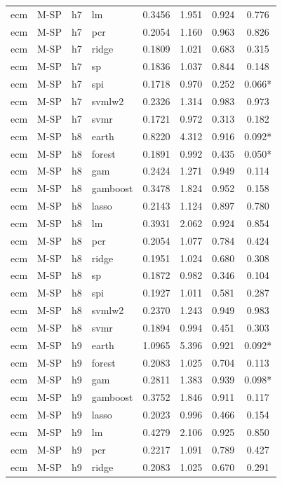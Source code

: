 \begin{ThreePartTable}
\begin{longtable}[t]{llclcccc}
ecm & M-SP & h7 & lm & 0.3456 & 1.951 & 0.924 & 0.776\\
ecm & M-SP & h7 & pcr & 0.2054 & 1.160 & 0.963 & 0.826\\
ecm & M-SP & h7 & ridge & 0.1809 & 1.021 & 0.683 & 0.315\\
ecm & M-SP & h7 & sp & 0.1836 & 1.037 & 0.844 & 0.148\\
ecm & M-SP & h7 & spi & 0.1718 & 0.970 & 0.252 & 0.066*\\
ecm & M-SP & h7 & svmlw2 & 0.2326 & 1.314 & 0.983 & 0.973\\
ecm & M-SP & h7 & svmr & 0.1721 & 0.972 & 0.313 & 0.182\\
\addlinespace
ecm & M-SP & h8 & earth & 0.8220 & 4.312 & 0.916 & 0.092*\\
ecm & M-SP & h8 & forest & 0.1891 & 0.992 & 0.435 & 0.050*\\
ecm & M-SP & h8 & gam & 0.2424 & 1.271 & 0.949 & 0.114\\
ecm & M-SP & h8 & gamboost & 0.3478 & 1.824 & 0.952 & 0.158\\
ecm & M-SP & h8 & lasso & 0.2143 & 1.124 & 0.897 & 0.780\\
ecm & M-SP & h8 & lm & 0.3931 & 2.062 & 0.924 & 0.854\\
ecm & M-SP & h8 & pcr & 0.2054 & 1.077 & 0.784 & 0.424\\
ecm & M-SP & h8 & ridge & 0.1951 & 1.024 & 0.680 & 0.308\\
ecm & M-SP & h8 & sp & 0.1872 & 0.982 & 0.346 & 0.104\\
ecm & M-SP & h8 & spi & 0.1927 & 1.011 & 0.581 & 0.287\\
ecm & M-SP & h8 & svmlw2 & 0.2370 & 1.243 & 0.949 & 0.983\\
ecm & M-SP & h8 & svmr & 0.1894 & 0.994 & 0.451 & 0.303\\
\addlinespace
ecm & M-SP & h9 & earth & 1.0965 & 5.396 & 0.921 & 0.092*\\
ecm & M-SP & h9 & forest & 0.2083 & 1.025 & 0.704 & 0.113\\
ecm & M-SP & h9 & gam & 0.2811 & 1.383 & 0.939 & 0.098*\\
ecm & M-SP & h9 & gamboost & 0.3752 & 1.846 & 0.911 & 0.117\\
ecm & M-SP & h9 & lasso & 0.2023 & 0.996 & 0.466 & 0.154\\
ecm & M-SP & h9 & lm & 0.4279 & 2.106 & 0.925 & 0.850\\
ecm & M-SP & h9 & pcr & 0.2217 & 1.091 & 0.789 & 0.427\\
ecm & M-SP & h9 & ridge & 0.2083 & 1.025 & 0.670 & 0.291\\

\end{longtable}
\end{ThreePartTable}
